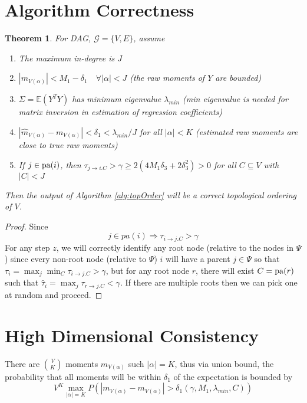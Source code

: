 \documentclass[]{article}
\newtheorem{theorem}{Theorem}
\newcommand{\E}{\mathbb{E}}
\newcommand{\pa}{{\rm pa}}       %
\begin{document}
\section{Algorithm Correctness}

\begin{theorem}
For DAG, $\mathcal{G} = \{V,E\}$, assume
\begin{enumerate}
\item The maximum in-degree is $J$
\item $|m_{V(\alpha)}| < M_1 - \delta_1 \quad \forall |\alpha| < J$ (the raw moments of $Y$ are bounded)
\item $\Sigma = \E(Y^T Y)$ has minimum eigenvalue $\lambda_{min}$ (min eigenvalue is needed for matrix inversion in estimation of regression coefficients)
\item $|\hat m_{V(\alpha)} - m_{V(\alpha)}| < \delta_1 < \lambda_{min}/J$ for all $|\alpha| < K$ (estimated raw moments are close to true raw moments)
\item If $j \in \pa(i)$, then $\tau_{j\rightarrow i.C} > \gamma   \geq 2 \left(4M_1\delta_3 + 2\delta_3^2\right) > 0$ for all $C \subseteq V$ with $|C| < J$
\end{enumerate}

Then the output of Algorithm \ref{alg:topOrder} will be a correct topological ordering of $V$. 
\end{theorem}

\begin{proof}
Since 
\begin{equation}
j \in pa(i) \Rightarrow \tau_{i\rightarrow j.C} > \gamma 
\end{equation}
For any step $z$, we will correctly identify any root node (relative to the nodes in $\Psi$) since every non-root node (relative to $\Psi$) $i$ will have a parent $j \in \Psi$ so that $\tau_i = \max_j \min_C \tau_{i\rightarrow j.C} > \gamma$, but for any root node $r$, there will exist $C = \pa(r)$ such that $\hat \tau_i = \max_j \tau_{r\rightarrow j.C} < \gamma$. If there are multiple roots then we can pick one at random and proceed.
\end{proof}

\section{High Dimensional Consistency}
There are ${V \choose K}$ moments $m_{V(\alpha)}$ such $|\alpha| = K$, thus via union bound, the probability that all moments will be within $\delta_1$ of the expectation is bounded by
\[ V^K \max_{|\alpha| = K}P\left(|m_{V(\alpha)} - m_{V(\alpha)}| > \delta_1(\gamma, M_1, \lambda_{min}, C)\right) \]
\end{document}
